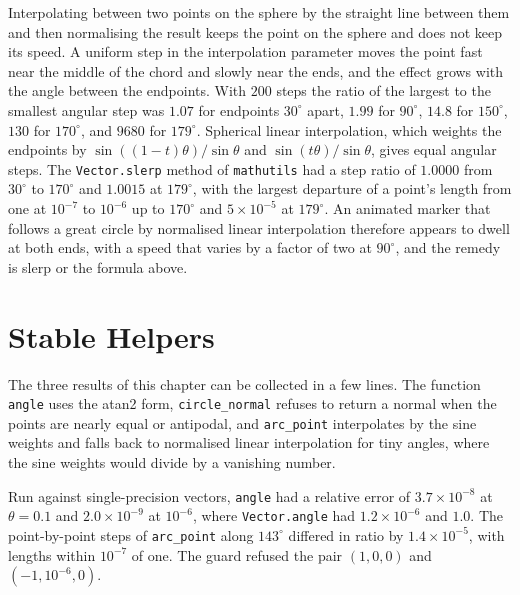 Interpolating between two points on the sphere by the straight line between them and then normalising the result keeps the point on the sphere and does not keep its speed. A uniform step in the interpolation parameter moves the point fast near the middle of the chord and slowly near the ends, and the effect grows with the angle between the endpoints. With $200$ steps the ratio of the largest to the smallest angular step was $1.07$ for endpoints $30^\circ$ apart, $1.99$ for $90^\circ$, $14.8$ for $150^\circ$, $130$ for $170^\circ$, and $9680$ for $179^\circ$. Spherical linear interpolation, which weights the endpoints by $\sin((1-t)\theta)/\sin\theta$ and $\sin(t\theta)/\sin\theta$, gives equal angular steps. The \texttt{Vector.slerp} method of \texttt{mathutils} had a step ratio of $1.0000$ from $30^\circ$ to $170^\circ$ and $1.0015$ at $179^\circ$, with the largest departure of a point's length from one at $10^{-7}$ to $10^{-6}$ up to $170^\circ$ and $5\times10^{-5}$ at $179^\circ$. An animated marker that follows a great circle by normalised linear interpolation therefore appears to dwell at both ends, with a speed that varies by a factor of two at $90^\circ$, and the remedy is slerp or the formula above.

\section{Stable Helpers}

The three results of this chapter can be collected in a few lines. The function \texttt{angle} uses the atan2 form, \texttt{circle\_normal} refuses to return a normal when the points are nearly equal or antipodal, and \texttt{arc\_point} interpolates by the sine weights and falls back to normalised linear interpolation for tiny angles, where the sine weights would divide by a vanishing number.



Run against single-precision vectors, \texttt{angle} had a relative error of $3.7\times10^{-8}$ at $\theta=0.1$ and $2.0\times10^{-9}$ at $10^{-6}$, where \texttt{Vector.angle} had $1.2\times10^{-6}$ and $1.0$. The point-by-point steps of \texttt{arc\_point} along $143^\circ$ differed in ratio by $1.4\times10^{-5}$, with lengths within $10^{-7}$ of one. The guard refused the pair $(1,0,0)$ and $(-1,10^{-6},0)$.

